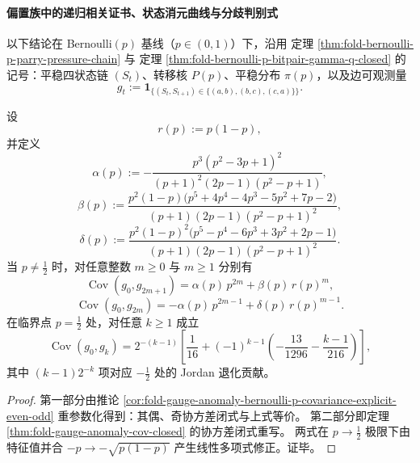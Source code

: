 \paragraph{偏置族中的递归相关证书、状态消元曲线与分歧判别式}
以下结论在 Bernoulli\((p)\) 基线（\(p\in(0,1)\)）下，沿用
定理 \ref{thm:fold-bernoulli-p-parry-pressure-chain} 与
定理 \ref{thm:fold-bernoulli-p-bitpair-gamma-q-closed}
的记号：平稳四状态链 \((S_t)\)、转移核 \(P(p)\)、平稳分布 \(\pi(p)\)，以及边可观测量
\[
g_t:=\mathbf 1_{\{(S_t,S_{t+1})\in\{(a,b),(b,c),(c,a)\}\}}.
\]

\begin{theorem}\label{thm:fold-bernoulli-p-full-autocovariance-jordan}
设
\[
r(p):=p(1-p),
\]
并定义
\[
\alpha(p):=
-\frac{p^{3}(p^{2}-3p+1)^{2}}{(p+1)^{2}(2p-1)(p^{2}-p+1)},
\]
\[
\beta(p):=
\frac{p^{2}(1-p)\bigl(p^{5}+4p^{4}-4p^{3}-5p^{2}+7p-2\bigr)}
{(p+1)(2p-1)(p^{2}-p+1)^{2}},
\]
\[
\delta(p):=
\frac{p^{2}(1-p)^{2}\bigl(p^{5}-p^{4}-6p^{3}+3p^{2}+2p-1\bigr)}
{(p+1)(2p-1)(p^{2}-p+1)^{2}}.
\]
当 \(p\neq \tfrac12\) 时，对任意整数 \(m\ge 0\) 与 \(m\ge 1\) 分别有
\[
\operatorname{Cov}(g_0,g_{2m+1})
=\alpha(p)\,p^{2m}+\beta(p)\,r(p)^m,
\]
\[
\operatorname{Cov}(g_0,g_{2m})
=-\alpha(p)\,p^{2m-1}+\delta(p)\,r(p)^{m-1}.
\]
在临界点 \(p=\tfrac12\) 处，对任意 \(k\ge 1\) 成立
\[
\operatorname{Cov}(g_0,g_k)
=2^{-(k-1)}
\left[
\frac1{16}
+(-1)^{k-1}\!\left(-\frac{13}{1296}-\frac{k-1}{216}\right)
\right],
\]
其中 \((k-1)2^{-k}\) 项对应 \(-\tfrac12\) 处的 Jordan 退化贡献。
\end{theorem}
\begin{proof}
第一部分由推论
\ref{cor:fold-gauge-anomaly-bernoulli-p-covariance-explicit-even-odd}
重参数化得到：其偶、奇协方差闭式与上式等价。
第二部分即定理 \ref{thm:fold-gauge-anomaly-cov-closed} 的协方差闭式重写。
两式在 \(p\to\tfrac12\) 极限下由特征值并合
\(
-p\to-\sqrt{p(1-p)}
\)
产生线性多项式修正。证毕。
\end{proof}



